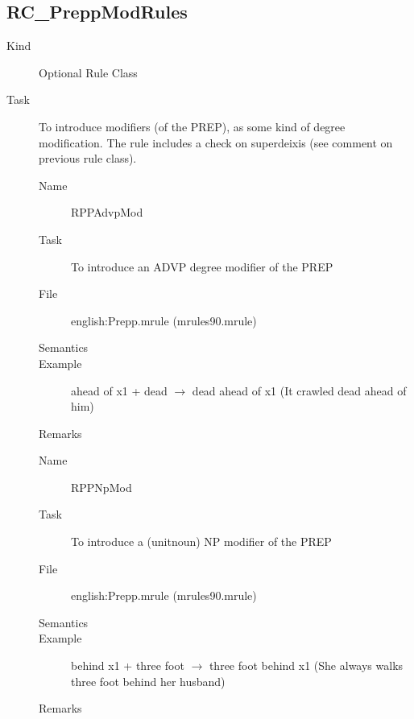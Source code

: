 \subsection{RC\_PreppModRules}
\begin{description}
\item[Kind] Optional Rule Class
\item[Task] To introduce modifiers (of the PREP), as some kind of 
degree modification. The rule includes a check on superdeixis (see comment on
previous rule class).

\vspace{1 cm}
\begin{description}
\item[Name] RPPAdvpMod
\item[Task] To introduce an ADVP degree modifier of the PREP
\item[File] english:Prepp.mrule (mrules90.mrule)
\item[Semantics]
\item[Example] ahead of x1 + dead $\rightarrow$ dead ahead of x1 (It crawled
dead ahead of him)
\item[Remarks]
\end{description}

\vspace{1 cm}
\begin{description}
\item[Name] RPPNpMod
\item[Task] To introduce a (unitnoun) NP modifier of the PREP
\item[File] english:Prepp.mrule (mrules90.mrule)
\item[Semantics]
\item[Example] behind x1 + three foot $\rightarrow$ three foot behind 
x1 (She always walks three foot behind her husband)
\item[Remarks]
\end{description}

\end{description}


\newpage
